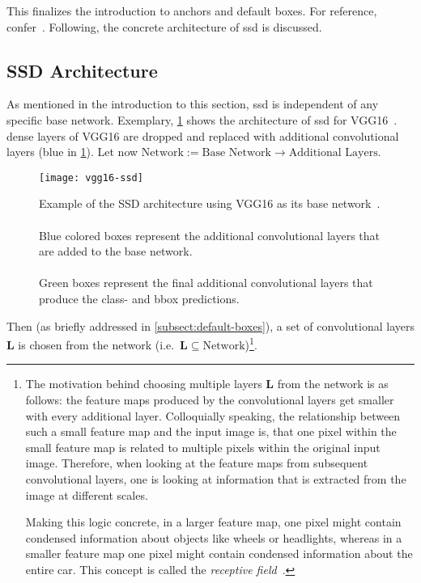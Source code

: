 This finalizes the introduction to anchors and default boxes. For reference,
confer~\cite{Liu.2016}. Following, the concrete architecture of \gls{ssd} is discussed.

\subsection{SSD Architecture}\label{subsect:SSD Architecture}
As mentioned in the introduction to this section, \gls{ssd} is independent of any
specific base network. Exemplary, \cref{fig:ssd-vgg} shows the architecture of
\gls{ssd} for VGG16~\cite{Simonyan.2015}. \Glspl{dense layer} of VGG16
are dropped and replaced with additional \glspl{convolutional layer} (blue in \cref{fig:ssd-vgg}).
Let now \(\text{Network}:=\text{Base Network}\rightarrow \text{Additional Layers}\).
\begin{figure}[th!]
    \centering
    \texttt{[image: vgg16-ssd]}
    \caption[Example of the SSD architecture using VGG16 as its base network]{Example
    of the SSD architecture using VGG16 as its base network~\cite[cf.][]{Liu.2016}.
    \\\\
    Blue colored boxes represent the additional \glspl{convolutional layer} that are added to the base network.
    \\\\
    Green boxes represent the final additional \glspl{convolutional layer} that produce
    the class- and \gls{bbox} predictions.}
    \label{fig:ssd-vgg}
\end{figure}
Then (as briefly addressed in \cref{subsect:default-boxes}), a set of
\glspl{convolutional layer} \(\mathbf{L}\) is chosen from the network (i.e.\
\(\mathbf{L}\subseteq \text{Network}\))\footnote{\label{foot:receptive}The motivation
behind choosing multiple layers \(\mathbf{L}\) from the network is as follows:
the \glspl{feature map} produced by the \glspl{convolutional layer} get smaller
with every additional layer. Colloquially speaking, the relationship between such
a small \gls{feature map} and the input image is, that one pixel within the small
\gls{feature map} is related to multiple pixels within the original input image.
Therefore, when looking at the \glspl{feature map} from subsequent
\glspl{convolutional layer}, one is looking at information that is extracted from
the image at different scales.

Making this logic concrete, in a larger \gls{feature map}, one pixel might contain
condensed information about objects like wheels or headlights, whereas in a smaller
\gls{feature map} one pixel might contain  condensed information about the entire
car. This concept is called the \textit{receptive field}~\cite[cf.][331\psq]{Goodfellow.2016}.}.

